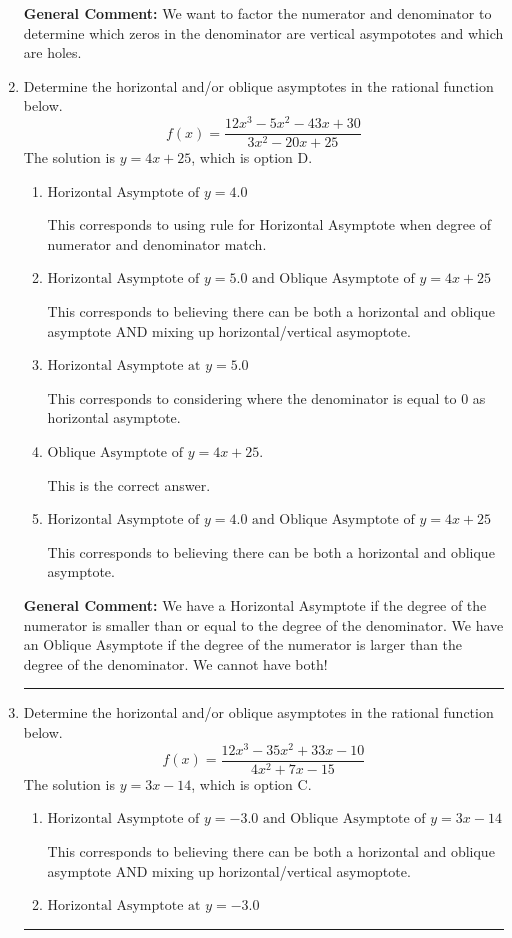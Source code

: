 \documentclass{extbook}[14pt]
\newcommand{\litem}[1]{\item #1

\rule{\textwidth}{0.4pt}}
\begin{document}
\begin{enumerate}
{\textbf{General Comment:} We want to factor the numerator and denominator to determine which zeros in the denominator are vertical asympototes and which are holes.
}
\litem{
Determine the horizontal and/or oblique asymptotes in the rational function below.
\[ f(x) = \frac{12x^{3} -5 x^{2} -43 x + 30}{3x^{2} -20 x + 25} \]The solution is \( y = 4x + 25 \), which is option D.\begin{enumerate}[label=\Alph*.]
\item \( \text{Horizontal Asymptote of } y = 4.0  \)

This corresponds to using rule for Horizontal Asymptote when degree of numerator and denominator match.
\item \( \text{Horizontal Asymptote of } y = 5.0 \text{ and Oblique Asymptote of } y = 4x + 25 \)

This corresponds to believing there can be both a horizontal and oblique asymptote AND mixing up horizontal/vertical asymoptote.
\item \( \text{Horizontal Asymptote at } y = 5.0 \)

This corresponds to considering where the denominator is equal to 0 as horizontal asymptote.
\item \( \text{Oblique Asymptote of } y = 4x + 25. \)

This is the correct answer.
\item \( \text{Horizontal Asymptote of } y = 4.0 \text{ and Oblique Asymptote of } y = 4x + 25 \)

This corresponds to believing there can be both a horizontal and oblique asymptote.
\end{enumerate}

\textbf{General Comment:} We have a Horizontal Asymptote if the degree of the numerator is smaller than or equal to the degree of the denominator. We have an Oblique Asymptote if the degree of the numerator is larger than the degree of the denominator. We cannot have both!
}
\litem{
Determine the horizontal and/or oblique asymptotes in the rational function below.
\[ f(x) = \frac{12x^{3} -35 x^{2} +33 x -10}{4x^{2} +7 x -15} \]The solution is \( y = 3x -14 \), which is option C.\begin{enumerate}[label=\Alph*.]
\item \( \text{Horizontal Asymptote of } y = -3.0 \text{ and Oblique Asymptote of } y = 3x -14 \)

This corresponds to believing there can be both a horizontal and oblique asymptote AND mixing up horizontal/vertical asymoptote.
\item \( \text{Horizontal Asymptote at } y = -3.0 \)


\end{enumerate}}
\end{enumerate}
\end{document}

